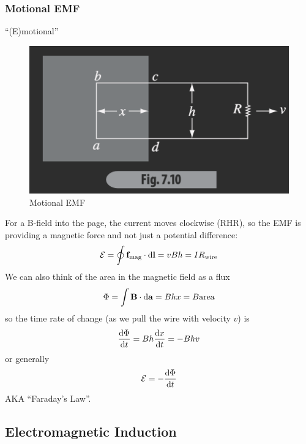 \documentclass[../main.tex]{subfiles}
\begin{document}
\subsubsection{Motional EMF}
``(E)motional'' 
\begin{figure}[ht]
    \centering
    \includegraphics[width=0.5\linewidth]{fig7_10.png}
    \caption{Motional EMF}
    \label{fig:gr7_8}
\end{figure}

For a B-field into the page, the current moves clockwise (RHR),
so the EMF is providing a magnetic force and not just a potential difference:
\begin{align*}
    \mathcal{E} = \oint \vb f_\text{mag} \cdot \dd{\vb l} = v B h = I R_\text{wire}
\end{align*}
We can also think of the area in the magnetic field as a flux
\begin{align*}
    \Phi = \int \vb B \cdot \dd{\vb a} = B h x = B \textrm{area}
\end{align*}
so the time rate of change (as we pull the wire with velocity $v$) is
\begin{align*}
    \dv{\Phi}{t} = B h \dv{x}{t} = -B h v
\end{align*}
or generally
\begin{align*}
    \mathcal{E} = -\dv{\Phi}{t}
\end{align*}
AKA ``Faraday's Law''.

\newpage
{}
\subsection{Electromagnetic Induction}
\end{document}
